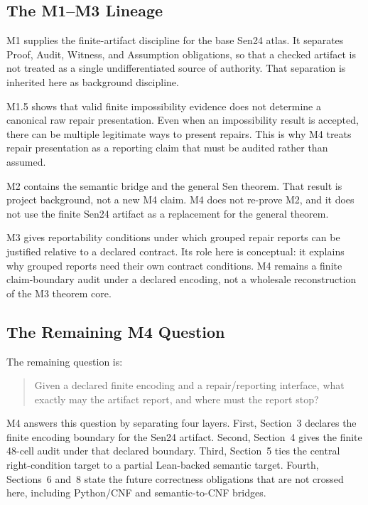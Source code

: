 \subsection{The M1--M3 Lineage}

M1 supplies the finite-artifact discipline for the base Sen24 atlas. It
separates Proof, Audit, Witness, and Assumption obligations, so that a checked
artifact is not treated as a single undifferentiated source of authority. That
separation is inherited here as background discipline.

M1.5 shows that valid finite impossibility evidence does not determine a
canonical raw repair presentation. Even when an impossibility result is
accepted, there can be multiple legitimate ways to present repairs. This is
why M4 treats repair presentation as a reporting claim that must be audited
rather than assumed.

M2 contains the semantic bridge and the general Sen theorem. That result is
project background, not a new M4 claim. M4 does not re-prove M2, and it does
not use the finite Sen24 artifact as a replacement for the general theorem.

M3 gives reportability conditions under which grouped repair reports can be
justified relative to a declared contract. Its role here is conceptual: it
explains why grouped reports need their own contract conditions. M4 remains a
finite claim-boundary audit under a declared encoding, not a wholesale
reconstruction of the M3 theorem core.

\subsection{The Remaining M4 Question}

The remaining question is:

\begin{quote}
Given a declared finite encoding and a repair/reporting interface, what
exactly may the artifact report, and where must the report stop?
\end{quote}

M4 answers this question by separating four layers. First, Section~3 declares
the finite encoding boundary for the Sen24 artifact. Second, Section~4 gives
the finite 48-cell audit under that declared boundary. Third, Section~5 ties
the central right-condition target to a partial Lean-backed semantic target.
Fourth, Sections~6 and~8 state the future correctness obligations that are not
crossed here, including Python/CNF and semantic-to-CNF bridges.

